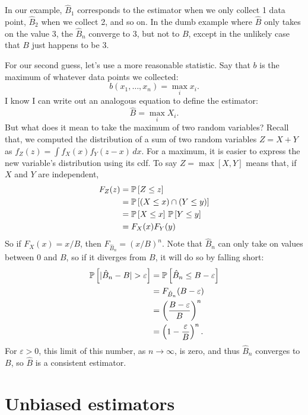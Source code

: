 In our example, $\hat{B}_1$ corresponds to the estimator when we only collect
1 data point, $\hat{B}_2$ when we collect 2, and so on. In the dumb example
where $\hat{B}$ only takes on the value 3, the $\hat{B}_n$ converge to 3, but not
to $B$, except in the unlikely case that $B$ just happens to be 3.

For our second guess, let's use a more reasonable statistic. Say that $b$
is the maximum of whatever data points we collected:
\begin{equation*}
    b(x_1, \ldots, x_n) = \max_i x_i.
\end{equation*}
I know I can write out an analogous equation to define the estimator:
\begin{equation*}
    \hat{B} = \max_i X_i.
\end{equation*}
But what does it mean to take the maximum of two random variables? Recall that,
we computed the distribution of a sum of two random variables $Z = X + Y$ as
$f_Z(z) = \int f_X(x) f_Y(z-x) \,dx$. For a maximum, it is easier to express the
new variable's distribution using its cdf. To say $Z = \max[X, Y]$ means that,
if $X$ and $Y$ are independent,
\begin{align*}
    F_Z(z) &= \mathbb{P}\left[{Z \leq z}\right] \\
    &= \mathbb{P}\left[{(X \leq x) \cap (Y \leq y)}\right] \\
    &= \mathbb{P}\left[{X \leq x}\right] \, \mathbb{P}\left[{Y \leq y}\right] \\
    &= F_X(x) F_Y(y)
\end{align*}
So if $F_X(x) = x/B$, then $F_{\hat{B}_n} = (x/B)^n$. Note that $\hat{B}_n$ can
only take on values between $0$ and $B$, so if it diverges from $B$, it will do
so by falling short:
\begin{align*}
    \mathbb{P}\left[{|\hat{B}_n - B| > \varepsilon}\right]
    &= \mathbb{P}\left[{\hat{B}_n \leq B - \varepsilon}\right] \\
    &= F_{\hat{B}_n}(B - \varepsilon) \\
    &= \left(\frac{B - \varepsilon}{B}\right)^n \\
    &= \left(1 - \frac{\varepsilon}{B}\right)^n.
\end{align*}
For $\varepsilon > 0$, this limit of this number, as $n \to \infty$, is zero,
and thus $\hat{B}_n$ converges to $B$, so $\hat{B}$ is a consistent estimator.

\section{Unbiased estimators}

